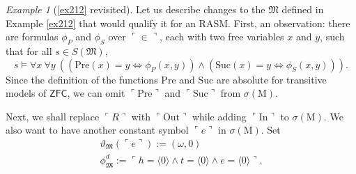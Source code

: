 \documentclass[12pt, twoside]{memoir}
\numberwithin{equation}{section}
\theoremstyle{definition}
\theoremstyle{remark}
\newtheorem{ex}[thm]{Example}
\theoremstyle{definition}
\theoremstyle{definition}
\theoremstyle{definition}
\theoremstyle{remark}
\begin{document}
\begin{ex}[\ref{ex212} revisited]\label{ex228}
Let us describe changes to the $\mathfrak{M}$ defined in Example \ref{ex212} that would qualify it for an RASM. First, an observation: there are formulas $\phi_P$ and $\phi_S$ over $\ulcorner \in \urcorner$, each with two free variables $x$ and $y$, such that for all $s \in S(\mathfrak{M})$,
\begin{equation*}
    s \models \forall x \ \forall y \ ((\mathrm{Pre}(x) = y \iff \phi_P(x, y)) \wedge (\mathrm{Suc}(x) = y \iff \phi_S(x, y))) \text{.}
\end{equation*}
Since the definition of the functions $\mathrm{Pre}$ and $\mathrm{Suc}$ are absolute for transitive models of $\mathsf{ZFC}$, we can omit $\ulcorner \mathrm{Pre} \urcorner$ and $\ulcorner \mathrm{Suc} \urcorner$ from $\sigma(\mathrm{M})$.

Next, we shall replace $\ulcorner R \urcorner$ with $\ulcorner \mathrm{Out} \urcorner$ while adding $\ulcorner \mathrm{In} \urcorner$ to $\sigma(\mathrm{M})$. We also want to have another constant symbol $\ulcorner e \urcorner$ in $\sigma(\mathrm{M})$. Set 
\begin{gather*}
    \vartheta_{\mathfrak{M}}(\ulcorner e \urcorner) := (\omega, 0) \\
    \phi^d_{\mathfrak{M}} := \ulcorner h = \langle 0 \rangle \wedge t = \langle 0 \rangle \wedge e = \langle 0 \rangle \urcorner \text{.}
\end{gather*}


\end{ex}
\end{document}
